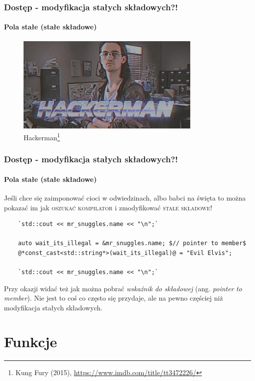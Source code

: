 \documentclass[aspectratio=169,10pt]{beamer}
\begin{document}
\begin{frame}
    \frametitle{Dostęp - modyfikacja stałych składowych?!}
    \framesubtitle{Pola stałe (stałe składowe)}

    \begin{figure}[!htp]
        \centering
        \includegraphics[width=9cm]{hackerman}
        \caption{Hackerman\footnote{Kung Fury (2015), \url{https://www.imdb.com/title/tt3472226/}}}
    \end{figure}
\end{frame}

\begin{frame}[fragile]
    \frametitle{Dostęp - modyfikacja stałych składowych?!}
    \framesubtitle{Pola stałe (stałe składowe)}

    Jeśli chce się zaimponować cioci w odwiedzinach, albo babci na święta to
    można pokazać im jak \textsc{oszukać kompilator} i zmodyfikować
    \textsc{stałe składowe}!

    {\scriptsize
    \begin{lstlisting}
    `std::cout << mr_snuggles.name << "\n";`

    auto wait_its_illegal = &mr_snuggles.name; $// pointer to member$
    @*const_cast<std::string*>(wait_its_illegal)@ = "Evil Elvis";

    `std::cout << mr_snuggles.name << "\n";`
    \end{lstlisting}}

    {\tiny Przy okazji widać też jak można pobrać \emph{wskaźnik do składowej}
    (ang. \emph{pointer to member}). Nie jest to coś co często się przydaje, ale
    na pewno częściej niż modyfikacja stałych składowych.}
\end{frame}

\section{Funkcje}
\end{document}
